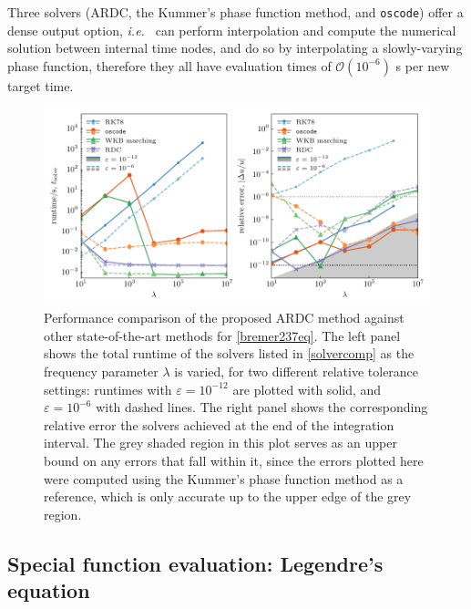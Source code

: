 \documentclass[10pt]{article}
\newcommand{\ie}{{\it i.e.\ }}
\begin{document}
Three solvers (ARDC, the
Kummer's phase function method, and \texttt{oscode}) offer a dense output option, \ie
can perform interpolation and compute the numerical solution between
internal time nodes, and do so by interpolating a slowly-varying phase function,
therefore they all have evaluation times of
$\mathcal{O}(10^{-6})$ \si{\s} per new target time.  

\begin{figure}[tb]
    \centering
    \includegraphics{plots/bremer237-timing.pdf}
    \caption{\label{bremer237-timing} Performance comparison of the proposed ARDC method against
    other state-of-the-art methods for \cref{bremer237eq}. The left panel
    shows the total runtime of the solvers listed in \cref{solvercomp} as the
    frequency parameter $\lambda$ is varied, for two different relative
    tolerance settings: runtimes with $\varepsilon = 10^{-12}$ are plotted with
    solid, and $\varepsilon = 10^{-6}$ with dashed lines. The right panel shows
    the corresponding relative error the solvers achieved at the end of the
    integration interval. The grey shaded region in this plot serves as an
    upper bound on any errors that fall within it, since the errors plotted
    here were computed using the Kummer's phase function method as a reference, which is
    only accurate up to the upper edge of the grey region.}
\end{figure}




\subsection{Special function evaluation: Legendre's equation}
\end{document}
